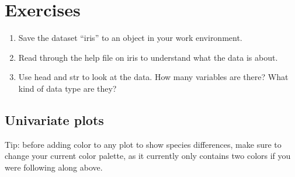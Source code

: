 \documentclass[]{article}
\begin{document}
\hypertarget{exercises}{%
\section{Exercises}\label{exercises}}

\begin{enumerate}
\def\labelenumi{\arabic{enumi}.}
\item
  Save the dataset ``iris'' to an object in your work environment.
\item
  Read through the help file on iris to understand what the data is
  about.
\item
  Use head and str to look at the data. How many variables are there?
  What kind of data type are they?
\end{enumerate}

\hypertarget{univariate-plots}{%
\subsection{Univariate plots}\label{univariate-plots}}

Tip: before adding color to any plot to show species differences, make
sure to change your current color palette, as it currently only contains
two colors if you were following along above.
\end{document}
